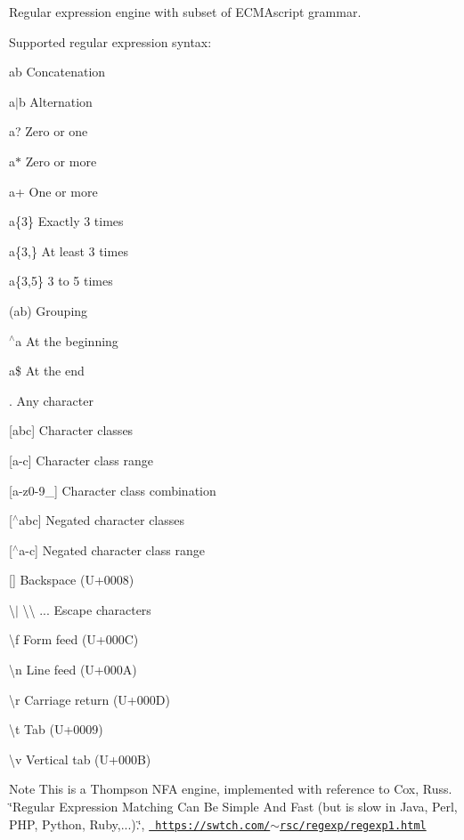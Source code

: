 Regular expression engine with subset of E\+C\+M\+Ascript grammar. 

Supported regular expression syntax\+:
\begin{DoxyItemize}
\item {\ttfamily ab} Concatenation
\item {\ttfamily a$\vert$b} Alternation
\item {\ttfamily a}? Zero or one
\item {\ttfamily a$\ast$} Zero or more
\item {\ttfamily a+} One or more
\item {\ttfamily a\{3\}} Exactly 3 times
\item {\ttfamily a\{3},\} At least 3 times
\item {\ttfamily a\{3},5\} 3 to 5 times
\item {\ttfamily }(ab) Grouping
\item {\ttfamily $^\wedge$a} At the beginning
\item {\ttfamily a\$} At the end
\item {\ttfamily }. Any character
\item {\ttfamily }\mbox{[}abc\mbox{]} Character classes
\item {\ttfamily }\mbox{[}a-\/c\mbox{]} Character class range
\item {\ttfamily }\mbox{[}a-\/z0-\/9\+\_\+\mbox{]} Character class combination
\item {\ttfamily }\mbox{[}$^\wedge$abc\mbox{]} Negated character classes
\item {\ttfamily }\mbox{[}$^\wedge$a-\/c\mbox{]} Negated character class range
\item {\ttfamily }\mbox{[}{\bfseries{}}\mbox{]} Backspace (U+0008)
\item {\ttfamily \textbackslash{}}$\vert$ \textbackslash{}\textbackslash{} ... Escape characters
\item {\ttfamily \textbackslash{}f} Form feed (U+000C)
\item {\ttfamily \textbackslash{}n} Line feed (U+000A)
\item {\ttfamily \textbackslash{}r} Carriage return (U+000D)
\item {\ttfamily \textbackslash{}t} Tab (U+0009)
\item {\ttfamily \textbackslash{}v} Vertical tab (U+000B)
\end{DoxyItemize}

\begin{DoxyNote}{Note}
This is a Thompson N\+FA engine, implemented with reference to Cox, Russ. \char`\"{}\+Regular Expression Matching Can Be Simple And Fast (but is slow in Java, Perl, P\+H\+P, Python, Ruby,...).\char`\"{}, \href{https://swtch.com/~rsc/regexp/regexp1.html}{\texttt{ https\+://swtch.\+com/$\sim$rsc/regexp/regexp1.\+html}} 
\end{DoxyNote}


